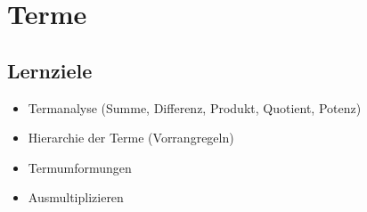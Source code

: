 
\section{Terme}

\subsection*{Lernziele}

\begin{itemize}
 \item Termanalyse (Summe, Differenz, Produkt, Quotient, Potenz)
 \item Hierarchie der Terme (Vorrangregeln)
 \item Termumformungen
 \item Ausmultiplizieren
\end{itemize}


\newpage

